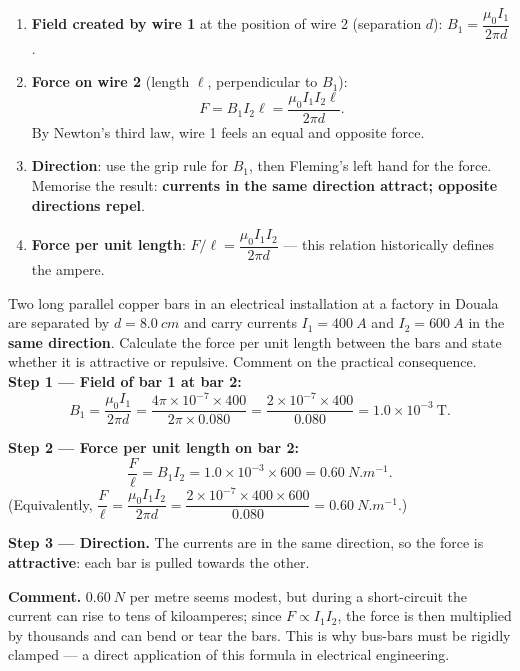 \documentclass[11pt]{article}
\begin{document}
\begin{methode}[Combining $B=\mu_0 I/2\pi r$ and $F=BIL$]
\begin{enumerate}
\item \textbf{Field created by wire 1} at the position of wire 2 (separation $d$): $B_1=\dfrac{\mu_0 I_1}{2\pi d}$.
\item \textbf{Force on wire 2} (length $\ell$, perpendicular to $B_1$):
\[ F = B_1 I_2 \ell = \frac{\mu_0 I_1 I_2 \ell}{2\pi d}. \]
By Newton's third law, wire 1 feels an equal and opposite force.
\item \textbf{Direction}: use the grip rule for $B_1$, then Fleming's left hand for the force. Memorise the result: \textbf{currents in the same direction attract; opposite directions repel}.
\item \textbf{Force per unit length}: $F/\ell=\dfrac{\mu_0 I_1 I_2}{2\pi d}$ — this relation historically defines the ampere.
\end{enumerate}
\end{methode}

\begin{exoresolu}
Two long parallel copper bars in an electrical installation at a factory in Douala are separated by $d=\SI{8.0}{cm}$ and carry currents $I_1=\SI{400}{A}$ and $I_2=\SI{600}{A}$ in the \textbf{same direction}. Calculate the force per unit length between the bars and state whether it is attractive or repulsive. Comment on the practical consequence.
\tcblower
\textbf{Step 1 — Field of bar 1 at bar 2:}
\[ B_1=\frac{\mu_0 I_1}{2\pi d}=\frac{4\pi\times10^{-7}\times 400}{2\pi\times 0.080}
=\frac{2\times10^{-7}\times400}{0.080}=1.0\times10^{-3}\ \mathrm{T}. \]

\textbf{Step 2 — Force per unit length on bar 2:}
\[ \frac{F}{\ell}=B_1 I_2 = 1.0\times10^{-3}\times 600 = \SI{0.60}{N.m^{-1}}. \]
(Equivalently, $\dfrac{F}{\ell}=\dfrac{\mu_0 I_1 I_2}{2\pi d}=\dfrac{2\times10^{-7}\times400\times600}{0.080}=\SI{0.60}{N.m^{-1}}$.)

\textbf{Step 3 — Direction.} The currents are in the same direction, so the force is \textbf{attractive}: each bar is pulled towards the other.

\textbf{Comment.} $\SI{0.60}{N}$ per metre seems modest, but during a short-circuit the current can rise to tens of kiloamperes; since $F\propto I_1 I_2$, the force is then multiplied by thousands and can bend or tear the bars. This is why bus-bars must be rigidly clamped — a direct application of this formula in electrical engineering.
\end{exoresolu}
\end{document}
